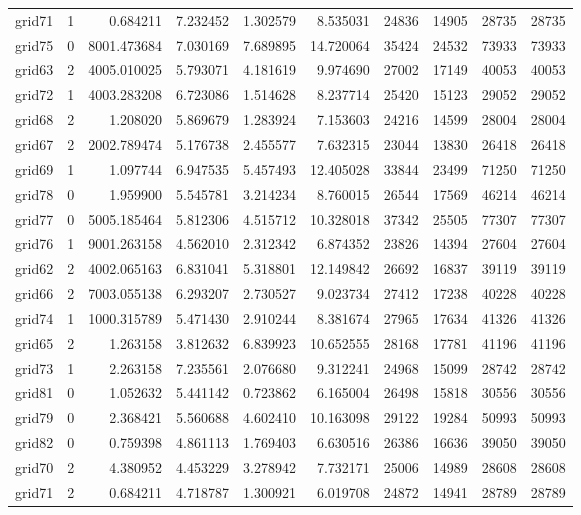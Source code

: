 \begin{longtable}{|l|r|r|r|r|r|r|r|r|r|}
grid71 & 1 & 0.684211 & 7.232452 & 1.302579 & 8.535031 & 24836 & 14905 & 28735 & 28735 \\
grid75 & 0 & 8001.473684 & 7.030169 & 7.689895 & 14.720064 & 35424 & 24532 & 73933 & 73933 \\
grid63 & 2 & 4005.010025 & 5.793071 & 4.181619 & 9.974690 & 27002 & 17149 & 40053 & 40053 \\
grid72 & 1 & 4003.283208 & 6.723086 & 1.514628 & 8.237714 & 25420 & 15123 & 29052 & 29052 \\
grid68 & 2 & 1.208020 & 5.869679 & 1.283924 & 7.153603 & 24216 & 14599 & 28004 & 28004 \\
grid67 & 2 & 2002.789474 & 5.176738 & 2.455577 & 7.632315 & 23044 & 13830 & 26418 & 26418 \\
grid69 & 1 & 1.097744 & 6.947535 & 5.457493 & 12.405028 & 33844 & 23499 & 71250 & 71250 \\
grid78 & 0 & 1.959900 & 5.545781 & 3.214234 & 8.760015 & 26544 & 17569 & 46214 & 46214 \\
grid77 & 0 & 5005.185464 & 5.812306 & 4.515712 & 10.328018 & 37342 & 25505 & 77307 & 77307 \\
grid76 & 1 & 9001.263158 & 4.562010 & 2.312342 & 6.874352 & 23826 & 14394 & 27604 & 27604 \\
grid62 & 2 & 4002.065163 & 6.831041 & 5.318801 & 12.149842 & 26692 & 16837 & 39119 & 39119 \\
grid66 & 2 & 7003.055138 & 6.293207 & 2.730527 & 9.023734 & 27412 & 17238 & 40228 & 40228 \\
grid74 & 1 & 1000.315789 & 5.471430 & 2.910244 & 8.381674 & 27965 & 17634 & 41326 & 41326 \\
grid65 & 2 & 1.263158 & 3.812632 & 6.839923 & 10.652555 & 28168 & 17781 & 41196 & 41196 \\
grid73 & 1 & 2.263158 & 7.235561 & 2.076680 & 9.312241 & 24968 & 15099 & 28742 & 28742 \\
grid81 & 0 & 1.052632 & 5.441142 & 0.723862 & 6.165004 & 26498 & 15818 & 30556 & 30556 \\
grid79 & 0 & 2.368421 & 5.560688 & 4.602410 & 10.163098 & 29122 & 19284 & 50993 & 50993 \\
grid82 & 0 & 0.759398 & 4.861113 & 1.769403 & 6.630516 & 26386 & 16636 & 39050 & 39050 \\
grid70 & 2 & 4.380952 & 4.453229 & 3.278942 & 7.732171 & 25006 & 14989 & 28608 & 28608 \\
grid71 & 2 & 0.684211 & 4.718787 & 1.300921 & 6.019708 & 24872 & 14941 & 28789 & 28789 \\

\end{longtable}
